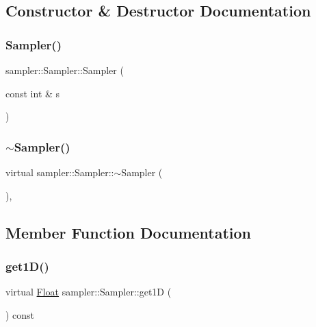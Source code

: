 \subsection{Constructor \& Destructor Documentation}
\mbox{\label{classsampler_1_1Sampler_a2561548f5b35cb8f177f83d817a69c9f}} 
\subsubsection{\texorpdfstring{Sampler()}{Sampler()}}
{\footnotesize\ttfamily sampler\+::\+Sampler\+::\+Sampler (\begin{DoxyParamCaption}\item[{const int \&}]{s }\end{DoxyParamCaption})\hspace{0.3cm}{\ttfamily [inline]}}

\mbox{\label{classsampler_1_1Sampler_af14ed59f9741fef7feec6c5ba8d113c3}} 
\subsubsection{\texorpdfstring{$\sim$Sampler()}{~Sampler()}}
{\footnotesize\ttfamily virtual sampler\+::\+Sampler\+::$\sim$\+Sampler (\begin{DoxyParamCaption}{ }\end{DoxyParamCaption})\hspace{0.3cm}{\ttfamily [inline]}, {\ttfamily [virtual]}}



\subsection{Member Function Documentation}
\mbox{\label{classsampler_1_1Sampler_a1bf2e7752ddd5b44fd291c04ffad3464}} 
\subsubsection{\texorpdfstring{get1D()}{get1D()}}
{\footnotesize\ttfamily virtual \mbox{\hyperlink{cyclop_8hpp_a07afd7094cb489cbd514c76e6f55d34f}{Float}} sampler\+::\+Sampler\+::get1D (\begin{DoxyParamCaption}{ }\end{DoxyParamCaption}) const\hspace{0.3cm}{\ttfamily [pure virtual]}}



